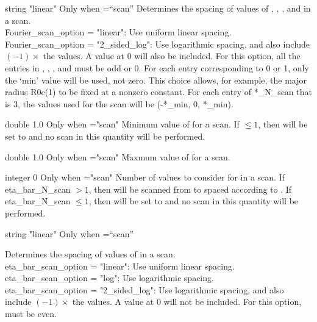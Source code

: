 \myhrule

{string}
{{\ttfamily "linear"}}
{Only when ={\ttfamily ``scan''}}
{Determines the spacing of values of , , , and  in a scan.\\

{\ttfamily Fourier\_scan\_option} = {\ttfamily "linear"}: Use uniform linear spacing.\\

{\ttfamily Fourier\_scan\_option} = {\ttfamily "2\_sided\_log"}: Use logarithmic spacing, and also include $(-1)\times$ the values. A value at 0 will also be included. 
For this option, all the entries in , , , and  must be odd or 0. 
For each entry corresponding to 0 or 1, only the `min' value will be used, not zero. This choice allows, for example, the major radius R0c(1) to be fixed at a nonzero constant.
For each entry of *\_N\_scan that is 3, the values used for the scan will be (-*\_min, 0, *\_min).
}

\myhrule

{double}
{1.0}
{Only when ={\ttfamily "scan"}}
{Minimum value of  for a scan. If $\le 1$, then  will be set to  and no scan in this quantity will be performed.
}

\myhrule

{double}
{1.0}
{Only when ={\ttfamily "scan"}}
{Maxmum value of  for a scan.
}

\myhrule

{integer}
{0}
{Only when ={\ttfamily "scan"}}
{Number of values to consider for  in a scan. If {\ttfamily eta\_bar\_N\_scan} $>1$, then  will be scanned from  to  spaced according to .
If {\ttfamily eta\_bar\_N\_scan} $\le 1$, then  will be set to  and no scan in
this quantity will be performed.
}

\myhrule

{string}
{{\ttfamily "linear"}}
{Only when ={\ttfamily ``scan''}}
{Determines the spacing of values of  in a scan.\\

{\ttfamily eta\_bar\_scan\_option} = {\ttfamily "linear"}: Use uniform linear spacing.\\

{\ttfamily eta\_bar\_scan\_option} = {\ttfamily "log"}: Use logarithmic spacing.\\

{\ttfamily eta\_bar\_scan\_option} = {\ttfamily "2\_sided\_log"}: Use logarithmic spacing, and also include $(-1)\times$ the values. A value at 0 will not be included. For this option,  must be even.

}

